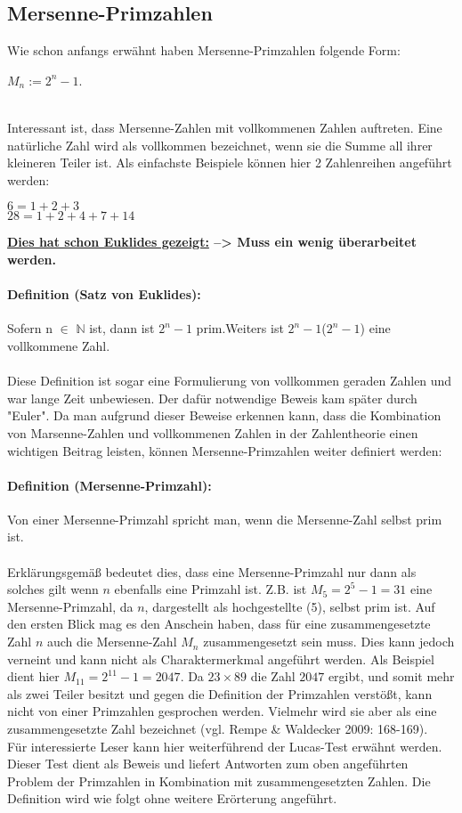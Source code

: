 \documentclass[german,12pt,a4paper]{article}
\begin{document}
\subsection{Mersenne-Primzahlen}
Wie schon anfangs erwähnt haben Mersenne-Primzahlen folgende Form:\\
\begin{center}
$M_n := 2^{n}-1$.
\end{center}\
\\Interessant ist, dass Mersenne-Zahlen mit vollkommenen Zahlen auftreten. Eine natürliche Zahl wird als vollkommen bezeichnet, wenn sie die Summe all ihrer kleineren Teiler ist. Als einfachste Beispiele können hier 2 Zahlenreihen angeführt werden:
\begin{center}
$6 = 1+2+3$\\
$28 = 1+2+4+7+14$
\end{center}
\textbf{\underline{Dies hat schon Euklides gezeigt:} --> Muss ein wenig überarbeitet werden.}
\paragraph{Definition (Satz von Euklides):}Sofern n $\in$ $\mathbb{N}$ ist, dann ist $2^{n}-1$ prim.Weiters ist $2^{n}-1$($2^{n}-1$) eine vollkommene Zahl.\\
\\Diese Definition ist sogar eine Formulierung von vollkommen geraden Zahlen und war lange Zeit unbewiesen. Der dafür notwendige Beweis kam später durch "{Euler}". Da man aufgrund dieser Beweise erkennen kann, dass die Kombination von Marsenne-Zahlen und vollkommenen Zahlen in der Zahlentheorie einen wichtigen Beitrag leisten, können Mersenne-Primzahlen weiter definiert werden:
\paragraph{Definition (Mersenne-Primzahl):}Von einer Mersenne-Primzahl spricht man, wenn die Mersenne-Zahl selbst prim ist.\\
\\Erklärungsgemäß bedeutet dies, dass eine Mersenne-Primzahl nur dann als solches gilt wenn $n$ ebenfalls eine Primzahl ist. Z.B. ist $M_5 = 2^{5}-1 = 31$ eine Mersenne-Primzahl, da $n$, dargestellt als hochgestellte (5), selbst prim ist. Auf den ersten Blick mag es den Anschein haben, dass für eine zusammengesetzte Zahl $n$ auch die Mersenne-Zahl $M_n$ zusammengesetzt sein muss. Dies kann jedoch verneint und kann nicht als Charaktermerkmal angeführt werden. Als Beispiel dient hier $M_{11} = 2^{11}-1 = 2047$. Da $23 \times 89$ die Zahl $2047$ ergibt, und somit mehr als zwei Teiler besitzt und gegen die Definition der Primzahlen verstößt, kann nicht von einer Primzahlen gesprochen werden. Vielmehr wird sie aber als eine zusammengesetzte Zahl bezeichnet (vgl. Rempe \& Waldecker 2009: 168-169).\\
Für interessierte Leser kann hier weiterführend der Lucas-Test erwähnt werden. Dieser Test dient als Beweis und liefert Antworten zum oben angeführten Problem der Primzahlen in Kombination mit zusammengesetzten Zahlen. Die Definition wird wie folgt ohne weitere Erörterung angeführt.
\end{document}
